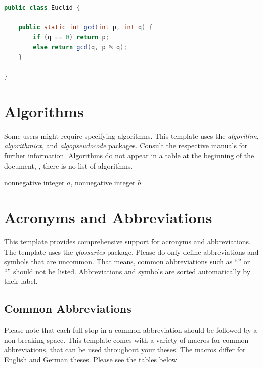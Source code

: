 \begin{lstlisting}[float=htp, caption={Euclid's GCD algorithm implemented in Java}, label={lst:euclid}, language=Java, deletekeywords={}, morekeywords={}]
public class Euclid {

	public static int gcd(int p, int q) {
		if (q == 0) return p;
		else return gcd(q, p % q);
	}

}
\end{lstlisting}

\section{Algorithms}
Some users might require specifying algorithms. This template uses the \textit{algorithm}, \textit{algorithmicx}, and \textit{algopseudocode} packages. Consult the respective manuals for further information. Algorithms do not appear in a table at the beginning of the document, \ie, there is no list of algorithms.

\begin{algorithm}[htb]
	\begin{algorithmic}
		\Require nonnegative integer $a$, nonnegative integer $b$
		 
		\Else 
		\EndIf
		\EndFunction
	\end{algorithmic}
	\caption{Euclid's GCD algorithm in pseudocode}
	\label{alg:garbage}
\end{algorithm}

\section{Acronyms and Abbreviations}
This template provides comprehensive support for acronyms and abbreviations. The template uses the \textit{glossaries} package. 
Please do only define abbreviations and symbols that are uncommon. That means, common abbreviations such as \enquote{\eg} or \enquote{\ie} should not be listed. Abbreviations and symbols are sorted automatically by their label. 

\subsection{Common Abbreviations}
Please note that each full stop in a common abbreviation should be followed by a non-breaking space. This template comes with a variety of macros for common abbreviations, that can be used throughout your theses. The macros differ for English and German theses. Please see the tables below.

